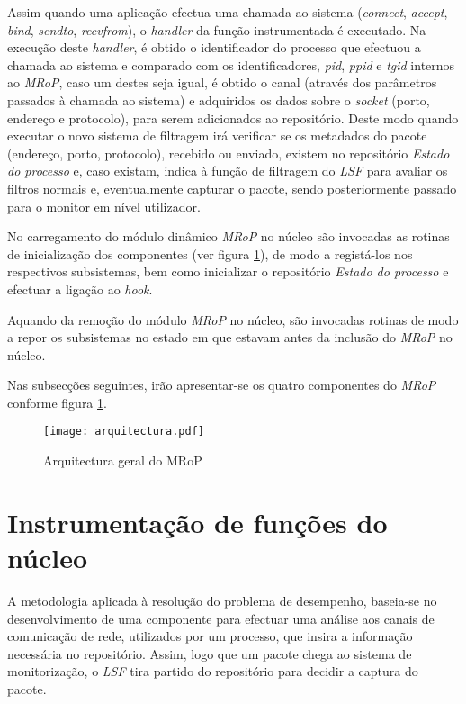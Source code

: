 Assim quando uma aplicação efectua uma chamada ao sistema (\textit{connect}, \textit{accept}, \textit{bind}, \textit{sendto}, \textit{recvfrom}), o \textit{handler} da função instrumentada é executado.
Na execução deste \textit{handler}, é obtido o identificador do processo que efectuou a chamada ao sistema e comparado com os identificadores, \textit{pid}, \textit{ppid} e \textit{tgid} internos ao \textit{MRoP}, caso um destes seja igual, é obtido o canal (através dos parâmetros passados à chamada ao sistema) e adquiridos os dados sobre o \textit{socket} (porto, endereço e protocolo), para serem adicionados ao repositório.
Deste modo quando executar o novo sistema de filtragem irá verificar se os metadados do pacote (endereço, porto, protocolo), recebido ou enviado, existem no repositório \textit{Estado do processo} e, caso existam, indica à função de filtragem do \textit{LSF} para avaliar os filtros normais e, eventualmente capturar o pacote, sendo posteriormente passado para o monitor em nível utilizador.

No carregamento do módulo dinâmico \textit{MRoP} no núcleo são invocadas as rotinas de inicialização dos componentes (ver figura \ref{fig:general_architecture}), de modo a registá-los nos respectivos subsistemas, bem como inicializar o repositório \textit{Estado do processo} e efectuar a ligação ao \textit{hook}.

Aquando da remoção do módulo \textit{MRoP} no núcleo, são invocadas rotinas de modo a repor os subsistemas no estado em que estavam antes da inclusão do \textit{MRoP} no núcleo.

Nas subsecções seguintes, irão apresentar-se os quatro componentes do \textit{MRoP} conforme figura \ref{fig:general_architecture}.

\begin{figure}[!htbp]
\centering
\texttt{[image: arquitectura.pdf]}
\caption{Arquitectura geral do MRoP}
\label{fig:general_architecture}
\end{figure}



\section{Instrumentação de funções do núcleo}

A metodologia aplicada à resolução do problema de desempenho, baseia-se no desenvolvimento de uma componente para efectuar uma análise aos canais de comunicação de rede, utilizados por um processo, que insira a informação necessária no repositório.
Assim, logo que um pacote chega ao sistema de monitorização, o \textit{LSF} tira partido do repositório para decidir a captura do pacote.

